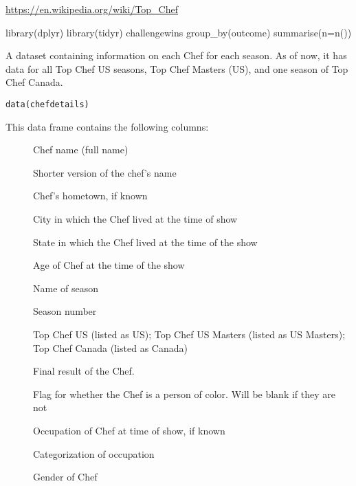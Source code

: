 \documentclass[a4paper]{book}
\begin{document}
%
\begin{Source}
\url{https://en.wikipedia.org/wiki/Top_Chef}
\end{Source}
%
\begin{Examples}
\begin{ExampleCode}
library(dplyr)
library(tidyr)
challengewins %
  group_by(outcome) %
  summarise(n=n())
\end{ExampleCode}
\end{Examples}
%
\begin{Description}
A dataset containing information on each Chef for each season. As of now,
it has data for all Top Chef US seasons, Top Chef Masters (US), and one
season of Top Chef Canada.
\end{Description}
%
\begin{Usage}
\begin{verbatim}
data(chefdetails)
\end{verbatim}
\end{Usage}
%
\begin{Format}
This data frame contains the following columns:
\begin{description}

\item[] Chef name (full name)
\item[] Shorter version of the chef's name
\item[] Chef's hometown, if known
\item[] City in which the Chef lived at the time of show
\item[] State in which the Chef lived at the time of the show
\item[] Age of Chef at the time of the show
\item[] Name of season
\item[] Season number
\item[] Top Chef US (listed as US); Top Chef US Masters
(listed as US Masters); Top Chef Canada (listed
as Canada)
\item[] Final result of the Chef.
\item[] Flag for whether the Chef is a person of color.
Will be blank if they are not
\item[] Occupation of Chef at time of show, if known
\item[] Categorization of occupation
\item[] Gender of Chef

\end{description}

\end{Format}
\end{document}
